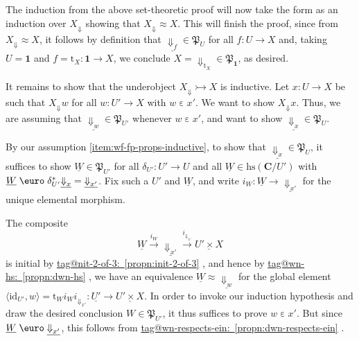 \documentclass{amsart}
\makeatletter
\newcommand\bC{\mathbf{C}}
\newcommand\br[1]{\langle{}#1\rangle{}}
\newcommand\Dwn{{\Downarrow}}
\newcommand\Ein{\mathrel{\text{\textup{\euro}}}}
\newcommand\ein{\mathrel{\varepsilon}}
\newcommand\fP{\mathfrak{P}}
\newcommand\hs{\mathrm{hs}}
\newcommand\id{\mathrm{id}}
\newcommand\rt{\mathrm{t}}
\newcommand\tm{\mathbf{1}}
\newcommand\tox[2][]{\xrightarrow[#1]{#2}}
\newcommand\tto{\rightarrowtail}
\newcommand\und[1]{\underline{#1}}
\newcommand\tagword[1]{\csname tag@#1\endcsname}
\def\label@tag#1:#2\@nil{#1}
\newcommand\labeltag[1]{\label@tag#1:\@nil}
\newcommand\jref[1]{%
  \texorpdfstring%
    {\hyperref[#1]{\tagword{\labeltag{#1}}~\ref*{#1}}}%
    {\tagword{\labeltag{#1}}~\ref*{#1}}%
}
\theoremstyle{definition}
\theoremstyle{remark}
\theoremstyle{plainwithref}
\makeatother
\begin{document}
The induction from the above set-theoretic proof will now take the form as an induction over \( X_{\Dwn} \) showing that \( X_\Dwn \approx X \).
This will finish the proof, since from \( X_\Dwn \approx X \), it follows by definition that \( \und{\Dwn_{f}} \in \fP_U \) for all \( f \colon U \to X \) and, taking \( U = \tm \) and \( f = \rt_X \colon \tm \to X \), we conclude \( X = \Dwn_{\rt_X} \in \fP_\tm \), as desired.

It remains to show that the underobject \( X_\Dwn \tto X \) is inductive.
Let \( x \colon U \to X \) be such that \( X_\Dwn w \) for all \( w \colon U' \to X \) with \( w \ein x' \).
We want to show \( X_\Dwn x \).
Thus, we are assuming that \( \und{\Dwn_{w}} \in \fP_{U'} \) whenever \( w \ein x' \), and want to show \( \und{\Dwn_{x}} \in \fP_U \).

By our assumption \ref{item:wf-fp-props-inductive}, to show that \( \und{\Dwn_{x}} \in \fP_U \), it suffices to show \( \und W \in \fP_{U'} \) for all \( \delta_{U'} \colon U' \to U \) and all \( \und W \in \hs(\bC / {U'}) \) with \( \und W \Ein \delta_{U'}^* \und{\Dwn_{x}} = \und{\Dwn_{x'}} \).
Fix such a \( U' \) and \( \und W \), and write \( i_W \colon \und W \to \und{\Dwn_{x'}} \) for the unique elemental morphism.

The composite
\[
  \und W \tox{i_W} \und{\Dwn_{x'}} \tox{i_{\Dwn_{x'}}} \und{U' \times X}
\]
is initial by \jref{propn:init-2-of-3}, and hence by \jref{propn:dwn-hs}, we have an equivalence \( \und W \approx \und{\Dwn_w} \) for the global element \( \br{\id_{U'}, w} = {\rt_W i_W i_{\Dwn_{x'}}} \colon \und{U'} \to \und{U' \times X} \).
In order to invoke our induction hypothesis and draw the desired conclusion \( W \in \fP_{U'} \), it thus suffices to prove \( w \ein x' \).
But since \( \und W \Ein \und{\Dwn_{x'}} \), this follows from \jref{propn:dwn-respects-ein}.
\end{document}
